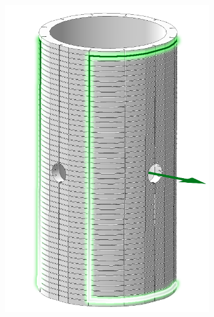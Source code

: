 \documentclass[PaulGanssle-Thesis.tex]{subfiles}
\begin{document}
\begin{figure}[ht!]
\begin{subfigure}[b]{0.3\textwidth}
\includegraphics[width=\textwidth]{figures/magnetometer/FieldCoilY.png}
\caption{}
\label{fig:FieldCoilY}
\end{subfigure}
\begin{subfigure}[b]{0.3\textwidth}
\centering

\end{subfigure}
\end{figure}
\end{document}
